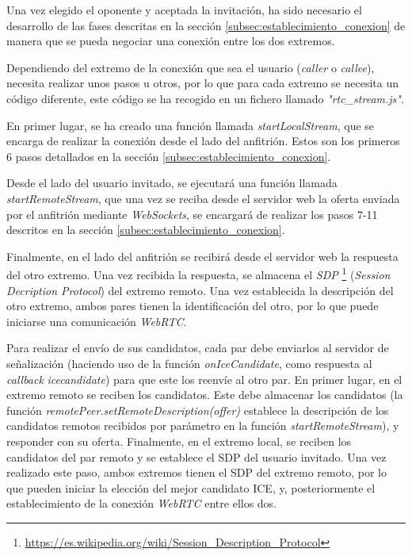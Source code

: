\documentclass[a4paper, 12pt]{book}
\begin{document}
Una vez elegido el oponente y aceptada la invitación, ha sido necesario el desarrollo de las fases descritas en la sección \ref{subsec:establecimiento_conexion} de manera que se pueda negociar una conexión entre los dos extremos.

Dependiendo del extremo de la conexión que sea el usuario (\emph{caller} o \emph{callee}), necesita realizar unos pasos u otros, por lo que para cada extremo se necesita un código diferente, este código se ha recogido en un fichero llamado \emph{"rtc\_stream.js"}.

En primer lugar, se ha creado una función llamada \emph{startLocalStream}, que se encarga de realizar la conexión desde el lado del anfitrión. Estos son los primeros 6 pasos detallados en la sección \ref{subsec:establecimiento_conexion}.

Desde el lado del usuario invitado, se ejecutará una función llamada \emph{startRemoteStream}, que una vez se reciba desde el servidor web la oferta enviada por el anfitrión mediante \emph{WebSockets}, se encargará de realizar los pasos 7-11 descritos en la sección \ref{subsec:establecimiento_conexion}.

Finalmente, en el lado del anfitrión se recibirá desde el servidor web la respuesta del otro extremo. Una vez recibida la respuesta, se almacena el \emph{SDP} \footnote{\url{https://es.wikipedia.org/wiki/Session_Description_Protocol}} (\emph{Session Decription Protocol}) del extremo remoto. Una vez establecida la descripción del otro extremo, ambos pares tienen la identificación del otro, por lo que puede iniciarse una comunicación \emph{WebRTC}.

Para realizar el envío de sus candidatos, cada par debe enviarlos al servidor de señalización (haciendo uso de la función \emph{onIceCandidate}, como respuesta al \emph{callback} \emph{icecandidate}) para que este los reenvíe al otro par. En primer lugar, en el extremo remoto se reciben los candidatos. Este debe almacenar los candidatos (la función \emph{remotePeer.setRemoteDescription(offer)} establece la descripción de los candidatos remotos recibidos por parámetro en la función \emph{startRemoteStream}), y responder con su oferta. Finalmente, en el extremo local, se reciben los candidatos del par remoto y se establece el SDP del usuario invitado. Una vez realizado este paso, ambos extremos tienen el SDP del extremo remoto, por lo que pueden iniciar la elección del mejor candidato ICE, y, posteriormente el establecimiento de la conexión \emph{WebRTC} entre ellos dos.
\end{document}
